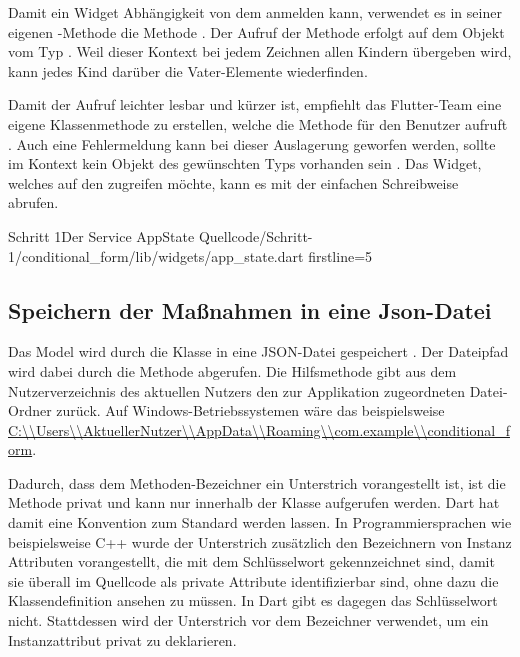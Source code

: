 Damit ein Widget Abhängigkeit von dem  anmelden kann, verwendet es in seiner eigenen -Methode die Methode . Der Aufruf der Methode erfolgt auf dem Objekt vom Typ . Weil dieser Kontext bei jedem Zeichnen allen Kindern übergeben wird, kann jedes Kind darüber die Vater-Elemente wiederfinden.

Damit der Aufruf leichter lesbar und kürzer ist, empfiehlt das Flutter-Team eine eigene Klassenmethode zu erstellen, welche die Methode für den Benutzer aufruft . Auch eine Fehlermeldung kann bei dieser Auslagerung geworfen werden, sollte im Kontext kein Objekt des gewünschten Typs vorhanden sein . Das Widget, welches auf den  zugreifen möchte, kann es mit der einfachen Schreibweise  abrufen.

\begin{alexlisting}{Schritt 1}{Der Service AppState}
  {Quellcode/Schritt-1/conditional_form/lib/widgets/app_state.dart}
  {firstline=5}
  \label{lst:Schritt1DerServiceAppState}
\end{alexlisting}

\clearpage
\subsection{Speichern der Maßnahmen in eine Json-Datei}
Das Model wird durch die Klasse  in eine JSON-Datei gespeichert \Lst{\ref{lst:Schritt1KlasseMassnahmenJsonFile}}. Der Dateipfad wird dabei durch die Methode   abgerufen. Die Hilfsmethode   gibt aus dem Nutzerverzeichnis des aktuellen Nutzers den zur Applikation zugeordneten Datei-Ordner zurück. Auf Windows-Betriebssystemen wäre das beispielsweise \url{C:\\Users\\AktuellerNutzer\\AppData\\Roaming\\com.example\\conditional_form}.

Dadurch, dass dem Methoden-Bezeichner  ein Unterstrich vorangestellt ist, ist die Methode privat und kann nur innerhalb der Klasse aufgerufen werden. Dart hat damit eine Konvention zum Standard werden lassen. In Programmiersprachen wie beispielsweise C++ wurde der Unterstrich zusätzlich den Bezeichnern von Instanz Attributen vorangestellt, die mit dem  Schlüsselwort gekennzeichnet sind, damit sie überall im Quellcode als private Attribute identifizierbar sind, ohne dazu die Klassendefinition ansehen zu müssen. In Dart gibt es dagegen das  Schlüsselwort nicht. Stattdessen wird der Unterstrich vor dem Bezeichner verwendet, um ein Instanzattribut privat zu deklarieren.

